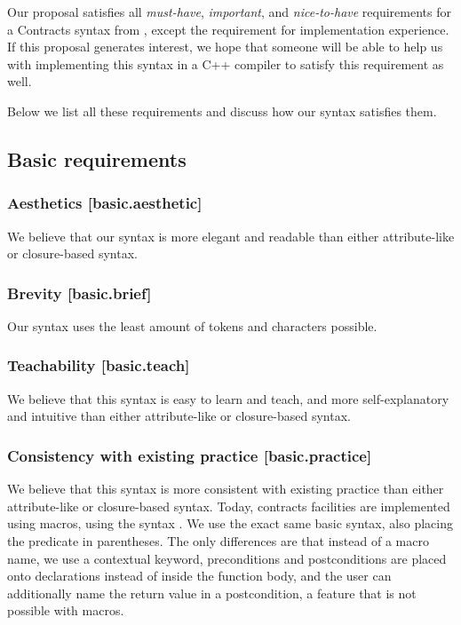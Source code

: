Our proposal satisfies all \emph{must-have}, \emph{important}, and \emph{nice-to-have} requirements for a Contracts syntax from \cite{P2885R2}, except the requirement for implementation experience. If this proposal generates interest, we hope that someone will be able to help us with implementing this syntax in a C++ compiler to satisfy this requirement as well.

Below we list all these requirements and discuss how our syntax satisfies them.

\subsection{Basic requirements}

\subsubsection{Aesthetics  [basic.aesthetic]}

We believe that our syntax is more elegant and readable than either attribute-like or closure-based syntax.

\subsubsection{Brevity  [basic.brief]}

Our syntax uses the least amount of tokens and characters possible.

\subsubsection{Teachability  [basic.teach]}

We believe that this syntax is easy to learn and teach, and more self-explanatory and intuitive than either attribute-like or closure-based syntax.

\subsubsection{Consistency with existing practice  [basic.practice]}

We believe that this syntax is more consistent with existing practice than either attribute-like or closure-based syntax. Today, contracts facilities are implemented using macros, using the syntax . We use the exact same basic syntax, also placing the predicate in parentheses. The only differences are that instead of a macro name, we use a contextual keyword, preconditions and postconditions are placed onto declarations instead of inside the function body, and the user can additionally name the return value in a postcondition, a feature that is not possible with macros.

